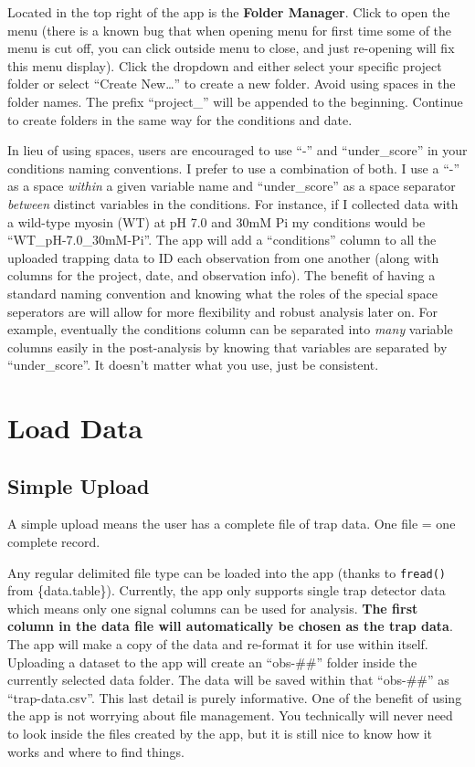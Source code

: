 \documentclass[
]{book}
\begin{document}
Located in the top right of the app is the \textbf{Folder Manager}. Click to open the menu (there is a known bug that when opening menu for first time some of the menu is cut off, you can click outside menu to close, and just re-opening will fix this menu display). Click the dropdown and either select your specific project folder or select ``Create New\ldots{}'' to create a new folder. Avoid using spaces in the folder names. The prefix ``project\_'' will be appended to the beginning. Continue to create folders in the same way for the conditions and date.

In lieu of using spaces, users are encouraged to use ``-'' and ``under\_score'' in your conditions naming conventions. I prefer to use a combination of both. I use a ``-'' as a space \emph{within} a given variable name and ``under\_score'' as a space separator \emph{between} distinct variables in the conditions. For instance, if I collected data with a wild-type myosin (WT) at pH 7.0 and 30mM Pi my conditions would be ``WT\_pH-7.0\_30mM-Pi''. The app will add a ``conditions'' column to all the uploaded trapping data to ID each observation from one another (along with columns for the project, date, and observation info). The benefit of having a standard naming convention and knowing what the roles of the special space seperators are will allow for more flexibility and robust analysis later on. For example, eventually the conditions column can be separated into \emph{many} variable columns easily in the post-analysis by knowing that variables are separated by ``under\_score''. It doesn't matter what you use, just be consistent.

\section{Load Data}\label{load-data}

\subsection{Simple Upload}\label{simple-upload}

A simple upload means the user has a complete file of trap data. One file = one complete record.

Any regular delimited file type can be loaded into the app (thanks to \texttt{fread()} from \{data.table\}). Currently, the app only supports single trap detector data which means only one signal columns can be used for analysis. \textbf{The first column in the data file will automatically be chosen as the trap data}. The app will make a copy of the data and re-format it for use within itself. Uploading a dataset to the app will create an ``obs-\#\#'' folder inside the currently selected data folder. The data will be saved within that ``obs-\#\#'' as ``trap-data.csv''. This last detail is purely informative. One of the benefit of using the app is not worrying about file management. You technically will never need to look inside the files created by the app, but it is still nice to know how it works and where to find things.
\end{document}
